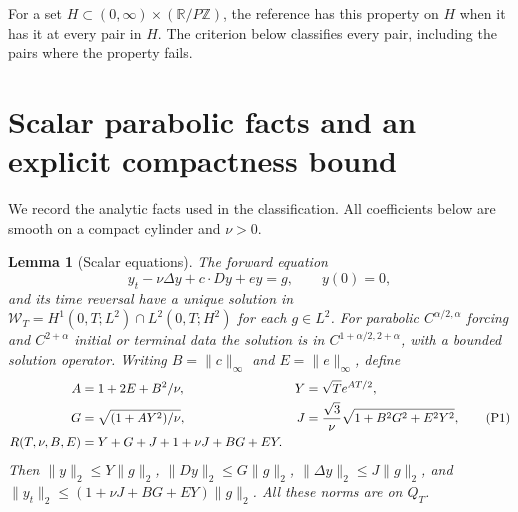 \documentclass[11pt,a4paper]{article}
\newtheorem{lemma}[theorem]{Lemma}
\begin{document}
For a set $H\subset(0,\infty)\times(\mathbb R/P\mathbb Z)$, the
reference has this property on $H$ when it has it at every pair in $H$.
The criterion below
classifies every pair, including the pairs where the property fails.

\section{Scalar parabolic facts and an explicit compactness bound}
We record the analytic facts used in the classification. All coefficients
below are smooth on a compact cylinder and $\nu>0$.

\begin{lemma}[Scalar equations]\label{scalar}
The forward equation
\[
 y_t-\nu\Delta y+c\cdot Dy+e y=g,\qquad y(0)=0,
\]
and its time reversal have a unique solution in
$\mathcal W_T=H^1(0,T;L^2)\cap L^2(0,T;H^2)$ for each $g\in L^2$.
For parabolic $C^{\alpha/2,\alpha}$ forcing and $C^{2+\alpha}$
initial or terminal data the solution is in
$C^{1+\alpha/2,2+\alpha}$, with a bounded solution operator.
Writing $B=\|c\|_\infty$ and $E=\|e\|_\infty$, define
\begin{align}
 A&=1+2E+B^2/\nu,&Y&=\sqrt T e^{AT/2},\notag\\
 G&=\sqrt{(1+AY^2)/\nu},&
 J&=\frac{\sqrt3}{\nu}\sqrt{1+B^2G^2+E^2Y^2},\tag{P1}\label{P1}\\
 R(T,\nu,B,E)&=Y+G+J+1+\nu J+BG+EY.\notag
\end{align}
Then $\|y\|_2\leq Y\|g\|_2$, $\|Dy\|_2\leq G\|g\|_2$,
$\|\Delta y\|_2\leq J\|g\|_2$, and
$\|y_t\|_2\leq(1+\nu J+BG+EY)\|g\|_2$.
All these norms are on $Q_T$.
\end{lemma}
\end{document}
